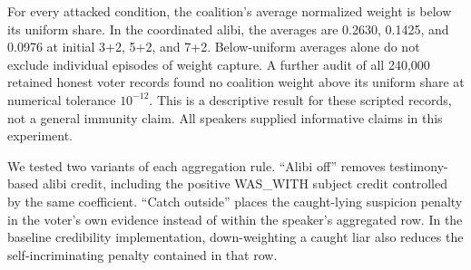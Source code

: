 \documentclass[
  12pt,
]{article}
\begin{document}
For every attacked condition, the coalition's average normalized weight
is below its uniform share. In the coordinated alibi, the averages are
0.2630, 0.1425, and 0.0976 at initial 3+2, 5+2, and 7+2. Below-uniform
averages alone do not exclude individual episodes of weight capture. A
further audit of all 240,000 retained honest voter records found no
coalition weight above its uniform share at numerical tolerance
\(10^{-12}\). This is a descriptive result for these scripted records,
not a general immunity claim. All speakers supplied informative claims
in this experiment.

We tested two variants of each aggregation rule. ``Alibi off'' removes
testimony-based alibi credit, including the positive WAS\_WITH subject
credit controlled by the same coefficient. ``Catch outside'' places the
caught-lying suspicion penalty in the voter's own evidence instead of
within the speaker's aggregated row. In the baseline credibility
implementation, down-weighting a caught liar also reduces the
self-incriminating penalty contained in that row.

\FloatBarrier
\end{document}
